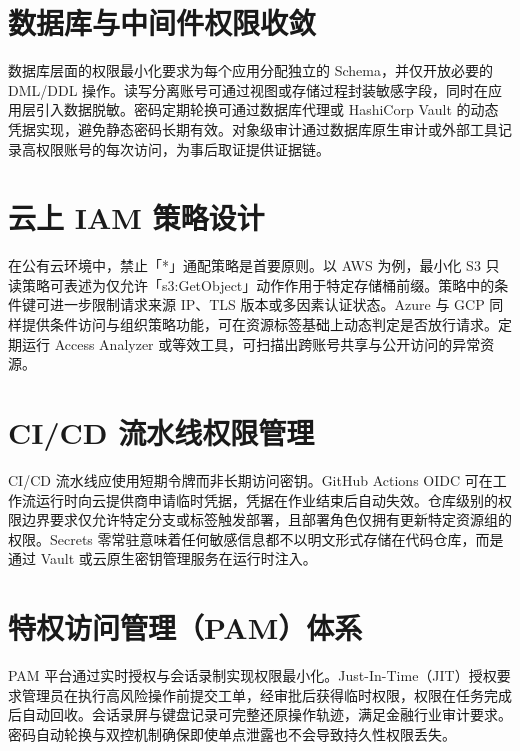 \chapter{数据库与中间件权限收敛}
数据库层面的权限最小化要求为每个应用分配独立的 Schema，并仅开放必要的 DML/DDL 操作。读写分离账号可通过视图或存储过程封装敏感字段，同时在应用层引入数据脱敏。密码定期轮换可通过数据库代理或 HashiCorp Vault 的动态凭据实现，避免静态密码长期有效。对象级审计通过数据库原生审计或外部工具记录高权限账号的每次访问，为事后取证提供证据链。\par
\chapter{云上 IAM 策略设计}
在公有云环境中，禁止「*」通配策略是首要原则。以 AWS 为例，最小化 S3 只读策略可表述为仅允许「s3:GetObject」动作作用于特定存储桶前缀。策略中的条件键可进一步限制请求来源 IP、TLS 版本或多因素认证状态。Azure 与 GCP 同样提供条件访问与组织策略功能，可在资源标签基础上动态判定是否放行请求。定期运行 Access Analyzer 或等效工具，可扫描出跨账号共享与公开访问的异常资源。\par
\chapter{CI/CD 流水线权限管理}
CI/CD 流水线应使用短期令牌而非长期访问密钥。GitHub Actions OIDC 可在工作流运行时向云提供商申请临时凭据，凭据在作业结束后自动失效。仓库级别的权限边界要求仅允许特定分支或标签触发部署，且部署角色仅拥有更新特定资源组的权限。Secrets 零常驻意味着任何敏感信息都不以明文形式存储在代码仓库，而是通过 Vault 或云原生密钥管理服务在运行时注入。\par
\chapter{特权访问管理（PAM）体系}
PAM 平台通过实时授权与会话录制实现权限最小化。Just-In-Time（JIT）授权要求管理员在执行高风险操作前提交工单，经审批后获得临时权限，权限在任务完成后自动回收。会话录屏与键盘记录可完整还原操作轨迹，满足金融行业审计要求。密码自动轮换与双控机制确保即使单点泄露也不会导致持久性权限丢失。\par
